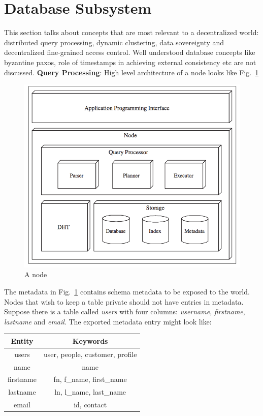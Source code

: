 \documentclass[preprint,12pt]{elsarticle}
\newcommand{\fscale}[1]{#1\linewidth}
\newcommand{\figref}[1]{Fig.~\ref{#1}}
\begin{document}
\section{Database Subsystem}
This section talks about concepts that are most relevant to a decentralized world: distributed query processing, dynamic clustering, data sovereignty and decentralized fine-grained access control. Well understood database concepts like byzantine paxos, role of timestamps in achieving external consistency etc are not discussed.
\newline
\newline
\textbf{Query Processing}: High level architecture of a node looks like \figref{fig:node_arch}
\begin{figure}[h!] \centering
	\includegraphics[width=\fscale{1}]{node_arch.png}
	\caption{A node}
	\label{fig:node_arch}
\end{figure}
The metadata in \figref{fig:node_arch} contains schema metadata to be exposed to the world. Nodes that wish to keep a table private should not have entries in metadata. Suppose there is a table called \textit{users} with four columns: \textit{username}, \textit{firstname}, \textit{lastname} and \textit{email}. The exported metadata entry might look like:
\begin{center}
	\begin{tabular}{| c | c |} 
		\hline
		Entity & Keywords \\ [0.5ex] 
		\hline
		users & user, people, customer, profile\\ 
		\hline
		name & name \\
		\hline
		firstname & fn, {f\_name}, {first\_name} \\
		\hline
		lastname & ln, {l\_name}, {last\_name} \\
		\hline
		email & id, contact \\ [1ex] 
		\hline
	\end{tabular}
\end{center}
\end{document}

